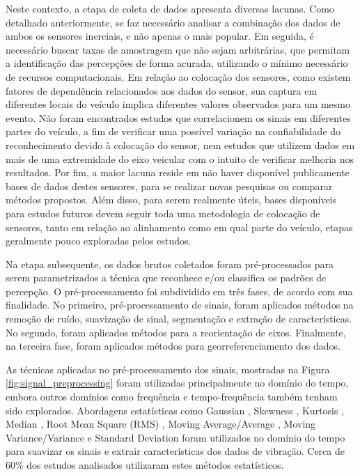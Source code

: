 Neste contexto, a etapa de coleta de dados apresenta diversas lacunas. Como detalhado anteriormente, se faz necessário analisar a combinação dos dados de ambos os sensores inerciais, e não apenas o mais popular. Em seguida, é necessário buscar taxas de amostragem que não sejam arbitrárias, que permitam a identificação das percepções de forma acurada, utilizando o mínimo necessário de recursos computacionais. Em relação ao colocação dos sensores, como existem fatores de dependência relacionados aos dados do sensor, sua captura em diferentes locais do veículo implica diferentes valores observados para um mesmo evento. Não foram encontrados estudos que correlacionem os sinais em diferentes partes do veículo, a fim de verificar uma possível variação na confiabilidade do reconhecimento devido à colocação do sensor, nem estudos que utilizem dados em mais de uma extremidade do eixo veicular com o intuito de verificar melhoria nos resultados. Por fim, a maior lacuna reside em não haver disponível publicamente bases de dados destes sensores, para se realizar novas pesquisas ou comparar métodos propostos. Além disso, para serem realmente úteis, bases disponíveis para estudos futuros devem seguir toda uma metodologia de colocação de sensores, tanto em relação ao alinhamento como em qual parte do veículo, etapas geralmente pouco exploradas pelos estudos.

Na etapa subsequente, os dados brutos coletados foram pré-processados para serem parametrizados a técnica que reconhece e/ou classifica os padrões de percepção. O pré-processamento foi subdividido em três fases, de acordo com sua finalidade. No primeiro, pré-processamento de sinais, foram aplicados métodos na remoção de ruído, suavização de sinal, segmentação e extração de características. No segundo, foram aplicados métodos para a reorientação de eixos. Finalmente, na terceira fase, foram aplicados métodos para georreferenciamento dos dados.

As técnicas aplicadas no pré-processamento dos sinais, mostradas na Figura \ref{fig:signal_preprocessing} foram utilizadas principalmente no domínio do tempo, embora outros domínios como frequência e tempo-frequência também tenham sido explorados. Abordagens estatísticas como Gaussian \cite{Pooja2017}, Skewness \cite{Alqudah2016}, Kurtosis \cite{Alqudah2016}, Median \cite{Alqudah2016,Li2016}, Root Mean Square (RMS) \cite{Jang2015,Li2018,Sharma2015}, Moving Average/Average \cite{Alqudah2016,Andria2016,Bose2018,Li2016, Pholprasit2015,Savera2016,Singh2017}, Moving Variance/Variance \cite{Alqudah2016,Andria2016} e Standard Deviation \cite{Andria2016,BelloSalau2018,Hou2017,Lima2016,Pholprasit2015,Prapulla2017} foram utilizados no domínio do tempo para suavizar os sinais e extrair características dos dados de vibração. Cerca de 60\% dos estudos analisados utilizaram estes métodos estatísticos.

